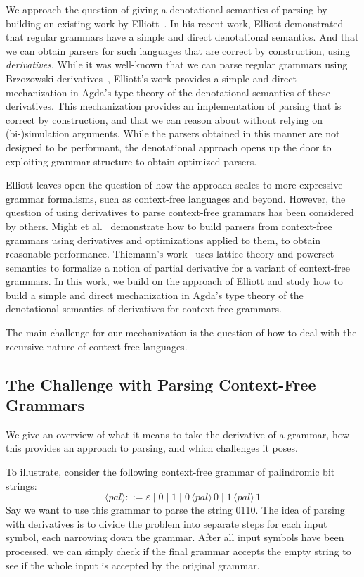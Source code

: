We approach the question of giving a denotational semantics of parsing by building on existing work by Elliott~\cite{conal-languages}.
In his recent work, Elliott demonstrated that regular grammars have a simple and direct denotational semantics.
And that we can obtain parsers for such languages that are correct by construction, using \emph{derivatives}.
While it was well-known that we can parse regular grammars using Brzozowski derivatives~\cite{brzozowski}, Elliott's work provides a simple and direct mechanization in Agda's type theory of the denotational semantics of these derivatives.
This mechanization provides an implementation of parsing that is correct by construction, and that we can reason about without relying on (bi-)simulation arguments.
While the parsers obtained in this manner are not designed to be performant, the denotational approach opens up the door to exploiting grammar structure to obtain optimized parsers.

Elliott leaves open the question of how the approach scales to more expressive grammar formalisms, such as context-free languages and beyond.
However, the question of using derivatives to parse context-free grammars has been considered by others.
Might et al.~\cite{parsing-with-derivatives} demonstrate how to build parsers from context-free grammars using derivatives and optimizations applied to them, to obtain reasonable performance.
Thiemann's work~\cite{Thiemann17} uses lattice theory and powerset semantics to formalize a notion of partial derivative for a variant of context-free grammars.
In this work, we build on the approach of Elliott and study how to build a simple and direct mechanization in Agda's type theory of the denotational semantics of derivatives for context-free grammars.

The main challenge for our mechanization is the question of how to deal with the recursive nature of context-free languages.

\subsection{The Challenge with Parsing Context-Free Grammars}

We give an overview of what it means to take the derivative of a grammar, how this provides an approach to parsing, and which challenges it poses.

To illustrate, consider the following context-free grammar of palindromic bit strings:
\[
\langle\mathit{pal}\rangle ::= ε \mid 0 \mid 1 \mid 0\, \langle\mathit{pal}\rangle\, 0 \mid 1\, \langle\mathit{pal}\rangle\, 1
\]
Say we want to use this grammar to parse the string 0110.
The idea of parsing with derivatives is to divide the problem into separate steps for each input symbol, each narrowing down the grammar.
After all input symbols have been processed, we can simply check if the final grammar accepts the empty string to see if the whole input is accepted by the original grammar.

